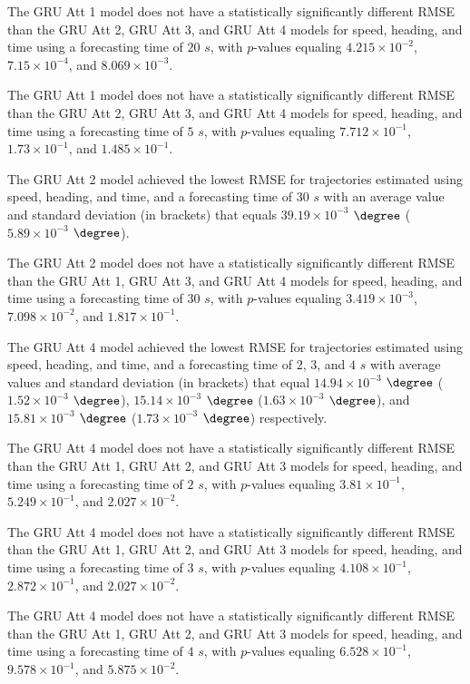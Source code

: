 The GRU Att 1 model does not have a statistically significantly different RMSE than the GRU Att 2, GRU Att 3, and GRU Att 4 models for speed, heading, and time using a forecasting time of $20$ $s$, with $p$-values equaling $4.215 \times 10^{-2}$, $7.15 \times 10^{-4}$, and $8.069 \times 10^{-3}$.

The GRU Att 1 model does not have a statistically significantly different RMSE than the GRU Att 2, GRU Att 3, and GRU Att 4 models for speed, heading, and time using a forecasting time of $5$ $s$, with $p$-values equaling $7.712 \times 10^{-1}$, $1.73 \times 10^{-1}$, and $1.485 \times 10^{-1}$.

The GRU Att 2 model achieved the lowest RMSE for trajectories estimated using speed, heading, and time, and a forecasting time of $30$ $s$ with an average value and standard deviation (in brackets) that equals $39.19 \times 10^{-3}$ $\degree$ ($5.89 \times 10^{-3}$ $\degree$).

The GRU Att 2 model does not have a statistically significantly different RMSE than the GRU Att 1, GRU Att 3, and GRU Att 4 models for speed, heading, and time using a forecasting time of $30$ $s$, with $p$-values equaling $3.419 \times 10^{-3}$, $7.098 \times 10^{-2}$, and $1.817 \times 10^{-1}$.

The GRU Att 4 model achieved the lowest RMSE for trajectories estimated using speed, heading, and time, and a forecasting time of $2$, $3$, and $4$ $s$ with average values and standard deviation (in brackets) that equal $14.94 \times 10^{-3}$ $\degree$ ($1.52 \times 10^{-3}$ $\degree$), $15.14 \times 10^{-3}$ $\degree$ ($1.63 \times 10^{-3}$ $\degree$), and $15.81 \times 10^{-3}$ $\degree$ ($1.73 \times 10^{-3}$ $\degree$) respectively.

The GRU Att 4 model does not have a statistically significantly different RMSE than the GRU Att 1, GRU Att 2, and GRU Att 3 models for speed, heading, and time using a forecasting time of $2$ $s$, with $p$-values equaling $3.81 \times 10^{-1}$, $5.249 \times 10^{-1}$, and $2.027 \times 10^{-2}$.

The GRU Att 4 model does not have a statistically significantly different RMSE than the GRU Att 1, GRU Att 2, and GRU Att 3 models for speed, heading, and time using a forecasting time of $3$ $s$, with $p$-values equaling $4.108 \times 10^{-1}$, $2.872 \times 10^{-1}$, and $2.027 \times 10^{-2}$.

The GRU Att 4 model does not have a statistically significantly different RMSE than the GRU Att 1, GRU Att 2, and GRU Att 3 models for speed, heading, and time using a forecasting time of $4$ $s$, with $p$-values equaling $6.528 \times 10^{-1}$, $9.578 \times 10^{-1}$, and $5.875 \times 10^{-2}$.

